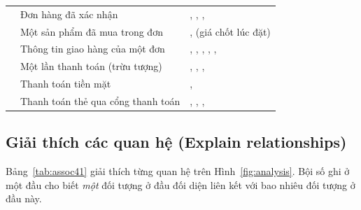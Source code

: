 \documentclass[12pt,a4paper]{article}
\begin{document}
\begin{longtable}{@{}P{2.6cm}P{6.5cm}P{6.8cm}@{}}
\small{} & \small Đơn hàng đã xác nhận & \small{}, , , \\
\small{} & \small Một sản phẩm đã mua trong đơn & \small{},  (giá chốt lúc đặt)\\
\small{} & \small Thông tin giao hàng của một đơn & \small{}, , , , , \\
\small{} & \small Một lần thanh toán (trừu tượng) & \small{}, , , \\
\small{} & \small Thanh toán tiền mặt & \small{}, \\
\small{} & \small Thanh toán thẻ qua cổng thanh toán & \small{}, , , \\
\bottomrule
\end{longtable}

\subsection{Giải thích các quan hệ (Explain relationships)}

Bảng~\ref{tab:assoc41} giải thích từng quan hệ trên Hình~\ref{fig:analysis}. Bội số ghi ở một đầu cho
biết \emph{một} đối tượng ở đầu đối diện liên kết với bao nhiêu đối tượng ở đầu này.
\end{document}

